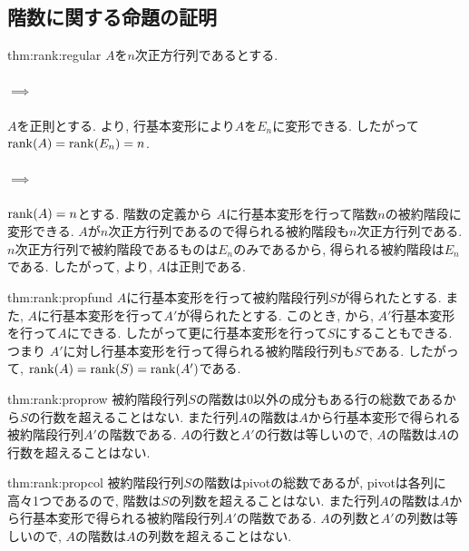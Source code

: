 \subsection{階数に関する命題の証明}
\begin{proofof}{thm:rank:regular}
  $A$を$n$次正方行列であるとする.
  \paragraph{$\implies$}
  $A$を正則とする.
  より,
  行基本変形により$A$を$E_n$に変形できる.
  したがって$\operatorname{rank}(A)=\operatorname{rank}(E_n)=n$.
  \paragraph{$\implies$}
  $\operatorname{rank}(A)=n$とする.
  階数の定義から
  $A$に行基本変形を行って階数$n$の被約階段に変形できる.
  $A$が$n$次正方行列であるので得られる被約階段も$n$次正方行列である.
  $n$次正方行列で被約階段であるものは$E_n$のみであるから,
  得られる被約階段は$E_n$である.
  したがって,
  より,
  $A$は正則である.
\end{proofof}

\begin{proofof*}{thm:rank:prop}{fund}
  $A$に行基本変形を行って被約階段行列$S$が得られたとする.
  また, $A$に行基本変形を行って$A'$が得られたとする.
  このとき,
  から, 
  $A'$行基本変形を行って$A$にできる.
  したがって更に行基本変形を行って$S$にすることもできる.
  つまり
  $A'$に対し行基本変形を行って得られる被約階段行列も$S$である.
  したがって, $\operatorname{rank}(A)=\operatorname{rank}(S)=\operatorname{rank}(A')$である.
\end{proofof*}

\begin{proofof*}{thm:rank:prop}{row}
  被約階段行列$S$の階数は$0$以外の成分もある行の総数であるから$S$の行数を超えることはない.
  また行列$A$の階数は$A$から行基本変形で得られる被約階段行列$A'$の階数である.
  $A$の行数と$A'$の行数は等しいので, $A$の階数は$A$の行数を超えることはない.
\end{proofof*}
\begin{proofof*}{thm:rank:prop}{col}
  被約階段行列$S$の階数はpivotの総数であるが,
  pivotは各列に高々1つであるので, 階数は$S$の列数を超えることはない.
  また行列$A$の階数は$A$から行基本変形で得られる被約階段行列$A'$の階数である.
  $A$の列数と$A'$の列数は等しいので, $A$の階数は$A$の列数を超えることはない.
\end{proofof*}

